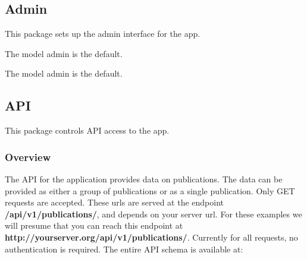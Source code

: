 \documentclass[letterpaper,10pt,english]{sphinxmanual}
\begin{document}
\subsection{Admin}
\label{papers:module-papers.admin}\label{papers:admin}
This package sets up the admin interface for the {\hyperref[papers:module-papers]{}} app.

\begin{fulllineitems}
\label{papers:papers.admin.AuthorDetailsAdmin}
The {\hyperref[papers:papers.models.AuthorDetails]{}} model admin is the default.

\end{fulllineitems}


\begin{fulllineitems}
\label{papers:papers.admin.PublicationAdmin}
The {\hyperref[papers:papers.models.Publication]{}} model admin is the default.

\end{fulllineitems}



\subsection{API}
\label{papers:api}\label{papers:module-papers.api}
This package controls API access to the {\hyperref[papers:module-papers]{}} app.


\subsubsection{Overview}
\label{papers:overview}
The API for the {\hyperref[papers:module-papers]{}} application provides data on publications.  The data can be provided as either a group of publications or as a single publication.  Only GET requests are accepted.
These urls are served at the endpoint \textbf{/api/v1/publications/}, and depends on your server url.  For these examples we will presume that you can reach this endpoint at \textbf{http://yourserver.org/api/v1/publications/}.  Currently for all requests, no authentication is required.  The entire API schema is available at:
\end{document}
